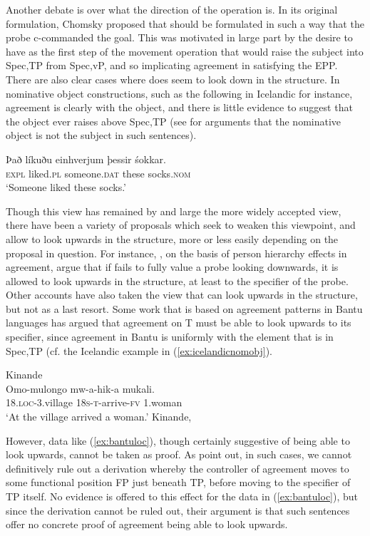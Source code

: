 \documentclass[output=paper
,modfonts
,nonflat]{langsci/langscibook}
\begin{document}
Another debate is over what the direction of the \agr {} operation is.
In its original formulation, Chomsky proposed that \agr {} should be formulated in such a way that the probe  c-commanded the goal.
This was motivated in large part by the desire to have {\agr} as the first step of the movement operation that would raise the subject into Spec,TP from Spec,vP, and so implicating agreement in satisfying the EPP.
There are also clear cases where {\agr} does seem to look down in the structure.
In nominative object constructions, such as the following in Icelandic for instance, agreement is clearly with the object, and there is little evidence to suggest that the object ever raises above Spec,TP (see \citealp{zmt1985} for arguments that the nominative object is not the subject in such sentences).
\begin{exe}
	\ex
	\gll Það líkuðu einhverjum þessir śokkar.\\
	\textsc{expl} liked.\textsc{pl} someone.\textsc{dat} these socks.\textsc{nom}\\
	\glt `Someone liked these socks.' \label{ex:icelandicnomobj}
\end{exe}
Though this view has remained by and large the more widely accepted view, there have been a variety of proposals which seek to weaken this viewpoint, and allow {\agr} to look upwards in the structure, more or less easily depending on the proposal in question.
For instance, \citet{bejarrezac2009}, on the basis of person hierarchy effects in agreement, argue that if {\agr} fails to fully value a probe looking downwards, it is allowed to look upwards in the structure, at least to the specifier of the probe.
Other accounts have also taken the view that {\agr} can look upwards in the structure, but not as a last resort.
Some work that is based on agreement patterns in Bantu languages has argued that agreement on T must be able to look upwards to its specifier, since agreement in Bantu is uniformly with the element that is in Spec,TP (cf. the Icelandic example in (\ref{ex:icelandicnomobj}).
\begin{exe}
	\ex Kinande \citep{Baker2003}\\
	\gll Omo-mulongo mw-a-hik-a mukali.\\
	\textsc{18.loc}-3.village \textsc{18s-t-}arrive-\textsc{fv} 1.woman\\
	\glt `At the village arrived a woman.' \label{ex:bantuloc} \hfill Kinande, \citet{Baker2003}
\end{exe} 
However, data like (\ref{ex:bantuloc}), though certainly suggestive of {\agr} being able to look upwards, cannot be taken as proof.
As \citet{premingerpolinsky2015} point out, in such cases, we cannot definitively rule out a derivation whereby the controller of agreement moves to some functional position FP just beneath TP, before moving to the specifier of TP itself.
No evidence is offered to this effect for the data in (\ref{ex:bantuloc}), but since the derivation cannot be ruled out, their argument is that such sentences offer no concrete proof of agreement being able to look upwards.
\end{document}
